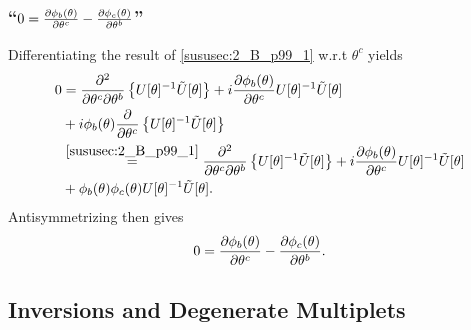 \subsubsection{\enquote{$0=\partialderivative{\phi_b(\theta)}{\theta^c}-\partialderivative{\phi_c(\theta)}{\theta^b}$} }
Differentiating the result of \ref{sususec:2_B_p99_1} w.r.t $\theta ^c$ yields
\begin{align*} 
	0&=\partialderivative{^2}{\theta^c\partial\theta^b}\left\{U[\theta]^{-1}\tilde{U}[\theta]\right\}+i\partialderivative{\phi_b(\theta)}{\theta^c} U[\theta]^{-1} \tilde{U}[\theta]\\
	&+i\phi_b(\theta)\partialderivative{}{\theta^c}\left\{U[\theta]^{-1}\tilde{U}[\theta]\right\}\\
	&\overset{\ref{sususec:2_B_p99_1}}{=}\partialderivative{^2}{\theta^c\partial\theta^b}\left\{U[\theta]^{-1}\tilde{U}[\theta]\right\}+i\partialderivative{\phi_b(\theta)}{\theta^c} U[\theta]^{-1} \tilde{U}[\theta]\\
	&+\phi_b(\theta)\phi_c(\theta) U[\theta]^{-1} \tilde{U}[\theta].
\end{align*}
Antisymmetrizing then gives 
\[0=\partialderivative{\phi_b(\theta)}{\theta^c}-\partialderivative{\phi_c(\theta)}{\theta^b}.\]




\subsection{Inversions and Degenerate Multiplets}\label{susec:2_C}
